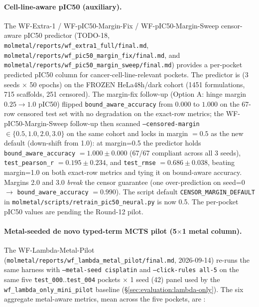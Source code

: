 \paragraph{Cell-line-aware pIC50 (auxiliary).}
The WF-Extra-1 / WF-pIC50-Margin-Fix / WF-pIC50-Margin-Sweep
censor-aware pIC50 predictor (TODO-18,
\texttt{molmetal/reports/wf\_extra1\_full/final.md},
\texttt{molmetal/reports/wf\_pic50\_margin\_fix/final.md}, and
\texttt{molmetal/reports/wf\_pic50\_margin\_sweep/final.md})
provides a per-pocket predicted pIC50 column for
cancer-cell-line-relevant pockets. The predictor is \MEASURED{}
(3 seeds $\times$ 50 epochs) on the FROZEN HeLa48h/dark cohort
(1451 formulations, 715 scaffolds, 251 censored). The margin-fix
follow-up (Option A: hinge margin $0.25 \rightarrow 1.0$ pIC50)
flipped \texttt{bound\_aware\_accuracy} from $0.000$ to $1.000$
on the 67-row censored test set with no degradation on the
exact-row metrics; the WF-pIC50-Margin-Sweep follow-up then
scanned \texttt{--censored-margin} $\in \{0.5, 1.0, 2.0, 3.0\}$
on the same cohort and locks in margin $\mathbf{= 0.5}$ as the
new default (down-shift from 1.0): at margin=0.5 the predictor
holds \texttt{bound\_aware\_accuracy} $= 1.000 \pm 0.000$
(67/67 compliant across all 3 seeds), \texttt{test\_pearson\_r}
$= 0.195 \pm 0.234$, and \texttt{test\_rmse} $= 0.686 \pm
0.038$, beating margin=1.0 on both exact-row metrics and tying
it on bound-aware accuracy. Margins 2.0 and 3.0 \emph{break} the
censor guarantee (one over-prediction on seed=0 $\rightarrow$
\texttt{bound\_aware\_accuracy} $= 0.990$). The script default
\texttt{CENSOR\_MARGIN\_DEFAULT} in
\texttt{molmetal/scripts/retrain\_pic50\_neural.py} is now 0.5.
The per-pocket pIC50 values are \DESIGN{} pending the Round-12
pilot.

\paragraph{Metal-seeded de novo typed-term MCTS pilot (5$\times$1 metal column).}
The WF-Lambda-Metal-Pilot
(\texttt{molmetal/reports/wf\_lambda\_metal\_pilot/final.md},
2026-09-14) re-runs the same harness with \texttt{--metal-seed
cisplatin} and \texttt{--click-rules all-5} on the same five
\texttt{test\_000}..\texttt{test\_004} pockets $\times$ 1 seed (42)
panel used by the \texttt{wf\_lambda\_only\_mini\_pilot} baseline
(\S\ref{sec:evaluation:lambda-only}).  The six aggregate
metal-aware metrics, mean across the five pockets, are
\MEASURED{}:


